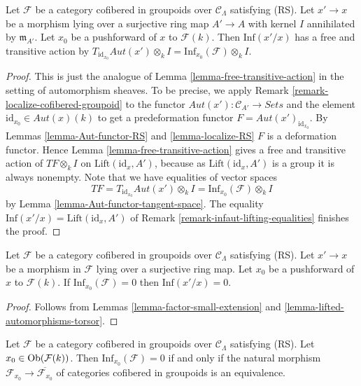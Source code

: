 \begin{lemma}
\label{lemma-lifted-automorphisms-torsor}
Let $\mathcal{F}$ be a category cofibered in groupoids over
$\mathcal{C}_\Lambda$ satisfying (RS). Let $x' \to x$ be a
morphism lying over a surjective ring map $A' \to A$ with kernel $I$
annihilated by $\mathfrak m_{A'}$. Let $x_0$ be a pushforward of $x$ to
$\mathcal{F}(k)$. Then $\text{Inf}(x'/x)$ has a free and transitive action by
$T_{\text{id}_{x_0}} \mathit{Aut}(x') \otimes_k I
= \text{Inf}_{x_0}(\mathcal{F}) \otimes_k I$.
\end{lemma}

\begin{proof}
This is just the analogue of
Lemma \ref{lemma-free-transitive-action}
in the setting of automorphism sheaves.
To be precise, we apply
Remark \ref{remark-localize-cofibered-groupoid}
to the functor $\mathit{Aut}(x') : \mathcal{C}_{A'} \to \textit{Sets}$
and the element $\text{id}_{x_0} \in \mathit{Aut}(x)(k)$ to get
a predeformation functor $F = \mathit{Aut}(x')_{\text{id}_{x_0}}$. By
Lemmas \ref{lemma-Aut-functor-RS} and \ref{lemma-localize-RS}
$F$ is a deformation functor. Hence
Lemma \ref{lemma-free-transitive-action}
gives a free and transitive action
of $TF \otimes_k I$ on $\text{Lift}(\text{id}_x, A')$, because as
$\text{Lift}(\text{id}_x, A')$ is a group it is always nonempty.
Note that we have equalities of vector spaces
$$
TF = T_{\text{id}_{x_0}} \mathit{Aut}(x') \otimes_k I =
\text{Inf}_{x_0}(\mathcal{F}) \otimes_k I
$$
by
Lemma \ref{lemma-Aut-functor-tangent-space}.
The equality $\text{Inf}(x'/x) = \text{Lift}(\text{id}_x, A')$ of
Remark \ref{remark-infaut-lifting-equalities}
finishes the proof.
\end{proof}

\begin{lemma}
\label{lemma-infaut-trivial}
Let $\mathcal{F}$ be a category cofibered in groupoids over
$\mathcal{C}_\Lambda$ satisfying (RS). Let $x' \to x$ be a morphism
in $\mathcal{F}$ lying over a surjective ring map. Let $x_0$ be a pushforward
of $x$ to $\mathcal{F}(k)$. If $\text{Inf}_{x_0}(\mathcal{F}) = 0$ then
$\text{Inf}(x'/x) = 0$.
\end{lemma}

\begin{proof}
Follows from
Lemmas \ref{lemma-factor-small-extension} and
\ref{lemma-lifted-automorphisms-torsor}.
\end{proof}

\begin{lemma}
\label{lemma-infdef-trivial}
Let $\mathcal{F}$ be a category cofibered in groupoids over
$\mathcal{C}_\Lambda$ satisfying (RS). Let
$x_0 \in \mathop{\mathrm{Ob}}\nolimits(\mathcal{F}(k))$. Then $\text{Inf}_{x_0}(\mathcal{F}) = 0$
if and only if the natural morphism
$\mathcal{F}_{x_0} \to \overline{\mathcal{F}_{x_0}}$ of
categories cofibered in groupoids is an equivalence.
\end{lemma}

